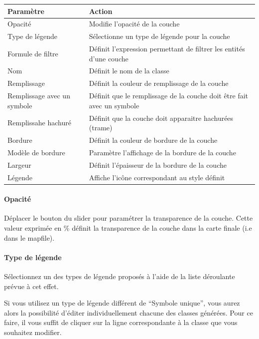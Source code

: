 \documentclass[letterpaper,10pt,french]{sphinxmanual}
\begin{document}
\begin{tabulary}{\linewidth}{|L|L|}
\hline

\textbf{Paramètre}
 & 
\textbf{Action}
\\
\hline
Opacité
 & 
Modifie l'opacité de la couche
\\
\hline
Type de légende
 & 
Sélectionne un type de légende pour la couche
\\
\hline
Formule de filtre
 & 
Définit l'expression permettant de filtrer les entités d'une couche
\\
\hline
Nom
 & 
Définit le nom de la classe
\\
\hline
Remplissage
 & 
Définit la couleur de remplissage de la couche
\\
\hline
Remplissage avec un symbole
 & 
Définit que le remplissage de la couche doit être fait avec un symbole
\\
\hline
Remplissahe hachuré
 & 
Définit que la couche doit apparaitre hachurées (trame)
\\
\hline
Bordure
 & 
Définit la couleur de bordure de la couche
\\
\hline
Modèle de bordure
 & 
Paramètre l'affichage de la bordure de la couche
\\
\hline
Largeur
 & 
Définit l'épaisseur de la bordure de la couche
\\
\hline
Légende
 & 
Affiche l'icône correspondant au style définit
\\
\hline\end{tabulary}

\paragraph{Opacité}

Déplacer le bouton du slider pour paramétrer la transparence de la couche. Cette valeur exprimée en \% définit la transparence de la couche dans la carte finale (i.e dans le mapfile).
\paragraph{Type de légende}

Sélectionnez un des types de légende proposés à l'aide de la liste déroulante prévue à cet effet.

Si vous utilisez un type de légende différent de ``Symbole unique'',
vous aurez alors la possibilité d'éditer individuellement chacune des classes
générées. Pour ce faire, il vous suffit de cliquer sur la ligne
correspondante à la classe que vous souhaitez modifier.
\end{document}
